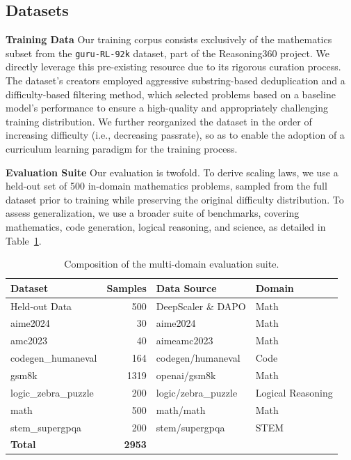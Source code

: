 \subsection{Datasets}

\textbf{Training Data} Our training corpus consists exclusively of the mathematics subset from the \texttt{guru-RL-92k} dataset, part of the Reasoning360 project\citep{cheng2025revisiting}. We directly leverage this pre-existing resource due to its rigorous curation process. The dataset's creators employed aggressive substring-based deduplication and a difficulty-based filtering method, which selected problems based on a baseline model's performance to ensure a high-quality and appropriately challenging training distribution. We further reorganized the dataset in the order of increasing difficulty (i.e., decreasing passrate), so as to enable the adoption of a curriculum learning paradigm for the training process.

\textbf{Evaluation Suite} Our evaluation is twofold. To derive scaling laws, we use a held-out set of 500 in-domain mathematics problems, sampled from the full dataset prior to training while preserving the original difficulty distribution. To assess generalization, we use a broader suite of benchmarks, covering mathematics, code generation, logical reasoning, and science, as detailed in Table~\ref{tab:eval_suite}.

\begin{table}[h]
\centering
\caption{Composition of the multi-domain evaluation suite.}
\label{tab:eval_suite}
\begin{tabular}{lrll}
\toprule
\textbf{Dataset} & \textbf{Samples} & \textbf{Data Source} & \textbf{Domain} \\
\midrule
Held-out Data & 500 & DeepScaler \& DAPO & Math \\
aime2024 & 30 & aime2024 & Math \\
amc2023 & 40 & aimeamc2023 & Math \\
codegen\_humaneval & 164 & codegen/humaneval & Code \\
gsm8k & 1319 & openai/gsm8k & Math \\
logic\_zebra\_puzzle & 200 & logic/zebra\_puzzle & Logical Reasoning \\
math & 500 & math/math & Math \\
stem\_supergpqa & 200 & stem/supergpqa & STEM \\
\midrule
\textbf{Total} & \textbf{2953} & & \\
\bottomrule
\end{tabular}
\end{table}